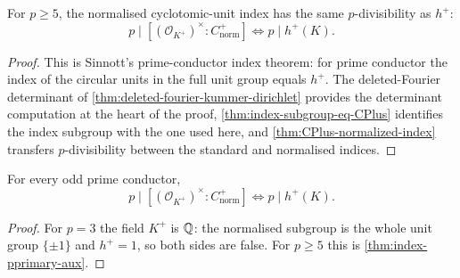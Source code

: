\begin{theorem}\label{thm:index-pprimary-aux}
  \leanok
For $p\ge5$, the normalised cyclotomic-unit index has the same
$p$-divisibility as $h^+$:
\[
  p\mid[(\mathcal O_{K^+})^\times:C^+_{\mathrm{norm}}]
  \Longleftrightarrow
  p\mid h^+(K).
\]
\end{theorem}
\begin{proof}\leanok
This is Sinnott's prime-conductor index theorem: for prime conductor the
index of the circular units in the full unit group equals $h^+$.  The
deleted-Fourier determinant of
\cref{thm:deleted-fourier-kummer-dirichlet} provides the determinant
computation at the heart of the proof,
\cref{thm:index-subgroup-eq-CPlus} identifies the index subgroup with the
one used here, and \cref{thm:CPlus-normalized-index} transfers
$p$-divisibility between the standard and normalised indices.
\end{proof}

\begin{theorem}\label{thm:sinnott-index-pprimary}
  \leanok
For every odd prime conductor,
\[
  p\mid[(\mathcal O_{K^+})^\times:C^+_{\mathrm{norm}}]
  \Longleftrightarrow
  p\mid h^+(K).
\]
\end{theorem}
\begin{proof}\leanok
For $p=3$ the field $K^+$ is $\mathbb{Q}$: the normalised subgroup is the whole
unit group $\{\pm1\}$ and $h^+=1$, so both sides are false.  For $p\ge5$
this is \cref{thm:index-pprimary-aux}.
\end{proof}
